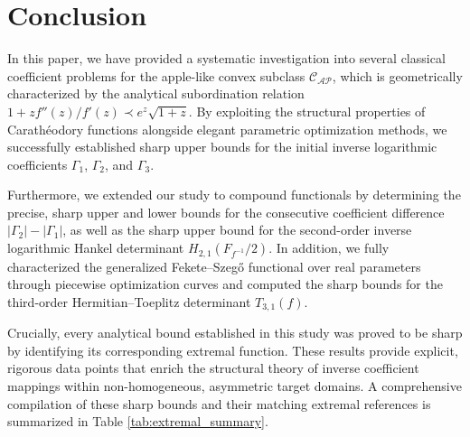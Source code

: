 \documentclass[10pt,a4paper]{amsart}
\numberwithin{equation}{section}
\begin{document}
\section{Conclusion}
In this paper, we have provided a systematic investigation into several classical coefficient problems for the apple-like convex subclass $\mathcal{C}_{\mathcal{AP}}$, which is geometrically characterized by the analytical subordination relation $1+zf''(z)/f'(z) \prec e^z\sqrt{1+z}$. By exploiting the structural properties of Carath\'{e}odory functions alongside elegant parametric optimization methods, we successfully established sharp upper bounds for the initial inverse logarithmic coefficients $\Gamma_1$, $\Gamma_2$, and $\Gamma_3$. 

Furthermore, we extended our study to compound functionals by determining the precise, sharp upper and lower bounds for the consecutive coefficient difference $|\Gamma_2| - |\Gamma_1|$, as well as the sharp upper bound for the second-order inverse logarithmic Hankel determinant $H_{2,1}\left(F_{f^{-1}}/2\right)$. In addition, we fully characterized the generalized Fekete--Szeg\H{o} functional over real parameters through piecewise optimization curves and computed the sharp bounds for the third-order Hermitian--Toeplitz determinant $T_{3,1}(f)$.

Crucially, every analytical bound established in this study was proved to be sharp by identifying its corresponding extremal function. These results provide explicit, rigorous data points that enrich the structural theory of inverse coefficient mappings within non-homogeneous, asymmetric target domains. A comprehensive compilation of these sharp bounds and their matching extremal references is summarized in Table \ref{tab:extremal_summary}.
\end{document}
